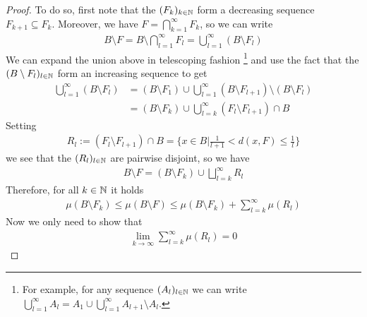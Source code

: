 \begin{proof}
  To do so, first note that the $(F_k)_{k \in \mathbb{N}}$ form a decreasing sequence $F_{k+1} \subseteq F_k$.
  Moreover, we have $F = \bigcap_{k=1}^{\infty} F_k$, so we can write
  \begin{align*}
    B \setminus F
    =
    B \setminus \bigcap_{l=1}^{\infty}F_l
    = \bigcup_{l=1}^{\infty} (B \setminus F_l)
  \end{align*}
  We can expand the union above in telescoping fashion
  \footnote{
    For example, for any sequence $(A_l)_{l \in \mathbb{N}}$ we can write $\bigcup_{l=1}^{\infty} A_l = A_1 \cup \bigcup_{l=1}^{\infty}A_{l+1} \setminus A_l$.
  }
  and use the fact that the $(B \setminus F_l)_{l \in \mathbb{N}}$ form an increasing sequence to get
  \begin{align*}
    \bigcup_{l=1}^{\infty}(B \setminus F_l) 
    &=
    (B \setminus F_1) \cup \bigcup_{l=1}^{\infty}(B \setminus F_{l+1}) \setminus (B \setminus F_l)\\
    &=
    (B \setminus F_k) \cup \bigcup_{l=k}^{\infty} (F_l \setminus F_{l+1}) \cap B
  \end{align*}
  Setting
  \begin{align*}
    R_l := (F_l \setminus F_{l+1}) \cap B = \{x \in B \big\vert \frac{1}{l+1} < d(x,F) \leq \frac{1}{l}\}
  \end{align*}
  we see that the $(R_l)_{l \in \mathbb{N}}$ are pairwise disjoint, so we have
  \begin{align*}
    B \setminus F = (B \setminus F_k) \cup \bigsqcup_{l=k}^{\infty} R_l
  \end{align*}
  Therefore, for all $k \in \mathbb{N}$ it holds
  \begin{align*}
    \mu(B \setminus F_k) \leq \mu(B \setminus F) \leq \mu(B \setminus F_k) + \sum_{l=k}^{\infty} \mu(R_l)
  \end{align*}
  Now we only need to show that
  \begin{align*}
    \lim_{k \to \infty} \sum_{l=k}^{\infty} \mu(R_l) = 0
  \end{align*}


\end{proof}
